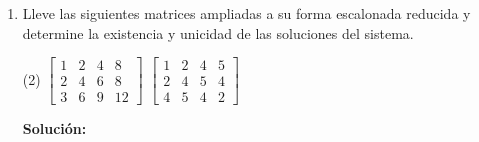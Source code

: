 \documentclass[12pt]{article}
\newenvironment{solucion}
{\begin{mdframed}[backgroundcolor=black!10]
		{\bf Solución:}\\
	}
	{
	\end{mdframed}
}
\newenvironment{preguntas}
{\begin{enumerate}\itemsep12pt
	}
	{
	\end{enumerate}
}
\begin{document}
\begin{preguntas}
\begin{solucion}
$$		\right] $$
		Aqui podemos apreciar que en el la última fila, todas las variables tienen coeficiente cero y la columna de coeficientes aumentados tiene valor, lo que no es posible, ya que esto significaría que se cumple la igualdad $0 = -8$, lo que no es cierto. Dicho esto, el sistema no es consistente.
\end{solucion}
\item Lleve las siguientes matrices ampliadas a su forma escalonada reducida y determine la existencia y unicidad de las soluciones del sistema.
\begin{tasks}(2)
\task $
		\begin{bmatrix}
		1 & 2 & 4 & 8\\
		2 & 4 & 6 & 8\\
		3 & 6 & 9 & 12
		\end{bmatrix}
		$
\task $
		\begin{bmatrix}
		1 & 2 & 4 & 5\\
		2 & 4 & 5& 4\\
		4 & 5 & 4 & 2
		\end{bmatrix}
		$
\end{tasks}
\begin{solucion}


\end{solucion}
\end{preguntas}
\end{document}
